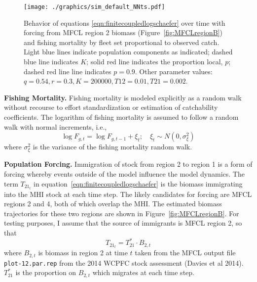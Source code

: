 \documentclass[12pt,letterpaper,twoside]{article}
\begin{document}
\begin{figure}
\begin{center}
\texttt{[image: ./graphics/sim\_default\_NNts.pdf]}
\caption{\label{fig:NNts}
Behavior of equations \ref{eqn:finitecoupledlogschaefer} over time with
forcing from MFCL region 2 biomass (Figure~\ref{fig:MFCLregionB}) and
fishing mortality by fleet set proportional to observed catch.
Light blue lines indicate population components as indicated; 
dashed blue line indicates $K$;
solid red line indicates the proportion local, $p$;  
dashed red line line indicates $p=0.9$.
Other parameter values: $q=0.54, r=0.3, K=200000, T12=0.01, T21=0.002$.
}
\end{center}
\end{figure}

{\bf Fishing Mortality.}
Fishing mortality is
modeled explicitly as a random walk
without recourse to effort standardization or
estimation of catchability coefficients. The logarithm of fishing
mortality is assumed to
follow a random walk with normal increments, i.e.,
\begin{equation}
\log F_{g,t} = \log F_{g,t-1} + \xi_t;\quad \xi_t\sim
N(0,\sigma^2_\xi) \label{eqn:Fwalk}
\end{equation}
where  $\sigma^2_\xi$ is the variance of the fishing
mortality random walk.

{\bf Population Forcing.}
Immigration of stock from region 2 to region 1 is a
form of forcing whereby events outside of the model influence the
model dynamics. The term $T_{{21}_t}$ in 
equation~\ref{eqn:finitecoupledlogschaefer}
is the biomass immigrating
into the MHI stock at each time step. 
The likely candidates for forcing are MFCL regions 2 and 4, both of
which overlap the MHI. The estimated biomass trajectories for these
two regions are shown in Figure~\ref{fig:MFCLregionB}.
For testing purposes,
I assume that the source of immigrants is MFCL region 2, so that
\begin{equation}
T_{{21}_t} = T^*_{21}\cdot B_{2,t}
\end{equation}
where $B_{2,t}$ is biomass in region 2 at time $t$ taken from the MFCL output file
{\tt plot-12.par.rep} from the 2014 WCPFC stock assessment
(Davies et al 2014). $T^*_{21}$ is the proportion on
$B_{2,t}$ which migrates at each time step.
\end{document}
